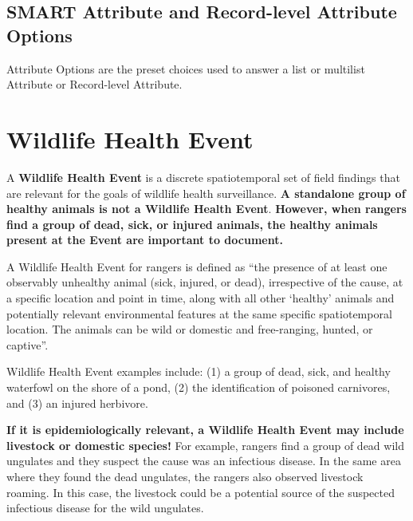 \documentclass[
  letterpaper,
  DIV=11,
  numbers=noendperiod]{scrreprt}
\begin{document}
\hypertarget{smart-attribute-and-record-level-attribute-options}{%
\subsection*{SMART Attribute and Record-level Attribute
Options}\label{smart-attribute-and-record-level-attribute-options}}

Attribute Options are the preset choices used to answer a list or
multilist Attribute or Record-level Attribute.

\hypertarget{wildlife-health-event}{%
\section*{Wildlife Health Event}\label{wildlife-health-event}}


A \textbf{Wildlife Health Event} is a discrete spatiotemporal set of
field findings that are relevant for the goals of wildlife health
surveillance. \textbf{A standalone group of healthy animals is not a
Wildlife Health Event}. \textbf{However, when rangers find a group of
dead, sick, or injured animals, the healthy animals present at the Event
are important to document.}

A Wildlife Health Event for rangers is defined as ``the presence of at
least one observably unhealthy animal (sick, injured, or dead),
irrespective of the cause, at a specific location and point in time,
along with all other `healthy' animals and potentially relevant
environmental features at the same specific spatiotemporal location. The
animals can be wild or domestic and free-ranging, hunted, or captive''.

Wildlife Health Event examples include: (1) a group of dead, sick, and
healthy waterfowl on the shore of a pond, (2) the identification of
poisoned carnivores, and (3) an injured herbivore.

\textbf{If it is epidemiologically relevant, a Wildlife Health Event may
include livestock or domestic species!} For example, rangers find a
group of dead wild ungulates and they suspect the cause was an
infectious disease. In the same area where they found the dead
ungulates, the rangers also observed livestock roaming. In this case,
the livestock could be a potential source of the suspected infectious
disease for the wild ungulates.
\end{document}
